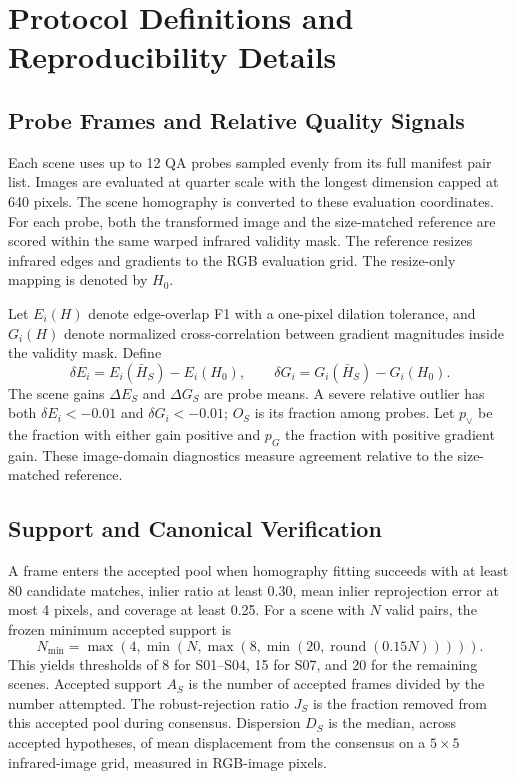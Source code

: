 
\section{Protocol Definitions and Reproducibility Details}
\label{sec:protocol_details}

\subsection{Probe Frames and Relative Quality Signals}

Each scene uses up to 12 QA probes sampled evenly from its full manifest pair list.
Images are evaluated at quarter scale with the longest
dimension capped at 640 pixels. The scene homography is converted to these evaluation coordinates.
For each probe, both the transformed image and the size-matched reference are scored within the
same warped infrared validity mask. The reference resizes infrared edges and gradients to the RGB
evaluation grid. The resize-only mapping is denoted by $H_0$.

Let $E_i(H)$ denote edge-overlap F1 with a one-pixel dilation tolerance, and $G_i(H)$ denote
normalized cross-correlation between gradient magnitudes inside the validity mask. Define
\begin{equation}
\delta E_i = E_i(\bar H_S)-E_i(H_0), \qquad
\delta G_i = G_i(\bar H_S)-G_i(H_0).
\end{equation}
The scene gains $\Delta E_S$ and $\Delta G_S$ are probe means. A severe relative outlier has both
$\delta E_i<-0.01$ and $\delta G_i<-0.01$; $O_S$ is its fraction among probes. Let $p_{\lor}$ be
the fraction with either gain positive and $p_G$ the fraction with positive gradient gain.
These image-domain diagnostics measure agreement relative to the size-matched reference.

\subsection{Support and Canonical Verification}
\label{sec:canonical_details}

A frame enters the accepted pool when homography fitting succeeds with at least 80 candidate
matches, inlier ratio at least 0.30, mean inlier reprojection error at most 4 pixels, and coverage
at least 0.25. For a scene with $N$ valid pairs, the frozen minimum accepted support is
\begin{equation}
N_{\min}=\max\!\left(4,\min\!\left(N,\max\!\left(8,
\min\!\left(20,\operatorname{round}(0.15N)\right)\right)\right)\right).
\end{equation}
This yields thresholds of 8 for S01--S04, 15 for S07, and 20 for the remaining scenes.
Accepted support $A_S$ is the number of accepted frames divided by the number attempted.
The robust-rejection ratio $J_S$ is the fraction removed from this accepted pool during consensus.
Dispersion $D_S$ is the median, across accepted hypotheses, of mean displacement from the consensus
on a $5\times5$ infrared-image grid, measured in RGB-image pixels.

